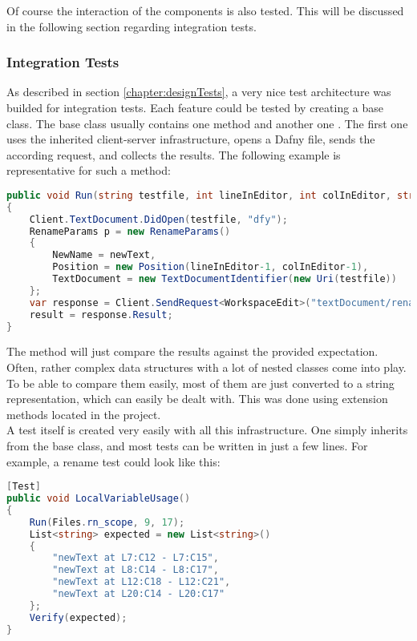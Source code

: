 Of course the interaction of the components is also tested.
This will be discussed in the following section regarding integration tests.

\subsubsection{Integration Tests}
As described in section \ref{chapter:designTests}, a very nice test architecture was builded for integration tests.
Each feature could be tested by creating a base class.
The base class usually contains one method  and another one .
The first one uses the inherited client-server infrastructure, opens a Dafny file, sends the according request, and collects the results.
The following example is representative for such a method:

\begin{lstlisting}[language=csharp, caption={Finding a Declaration}, captionpos=b, label={lst:visitorfinddecl}]
public void Run(string testfile, int lineInEditor, int colInEditor, string newText = "newText")
{
    Client.TextDocument.DidOpen(testfile, "dfy");
    RenameParams p = new RenameParams()
    {
        NewName = newText,
        Position = new Position(lineInEditor-1, colInEditor-1),
        TextDocument = new TextDocumentIdentifier(new Uri(testfile))
    };
    var response = Client.SendRequest<WorkspaceEdit>("textDocument/rename", p, CancellationSource.Token);
    result = response.Result;
}
\end{lstlisting}

The  method will just compare the results against the provided expectation.
Often, rather complex data structures with a lot of nested classes come into play.
To be able to compare them easily, most of them are just converted to a string representation, which can easily be dealt with.
This was done using extension methods located in the  project.\\

A test itself is created very easily with all this infrastructure.
One simply inherits from the base class, and most tests can be written in just a few lines.
For example, a rename test could look like this:

\begin{lstlisting}[language=csharp, caption={Sample Integration Test}, captionpos=b, label={lst:sampleintegrationtest}]
[Test]
public void LocalVariableUsage()
{
    Run(Files.rn_scope, 9, 17);
    List<string> expected = new List<string>()
    {
        "newText at L7:C12 - L7:C15",
        "newText at L8:C14 - L8:C17",
        "newText at L12:C18 - L12:C21",
        "newText at L20:C14 - L20:C17"
    };
    Verify(expected);
}
\end{lstlisting}

